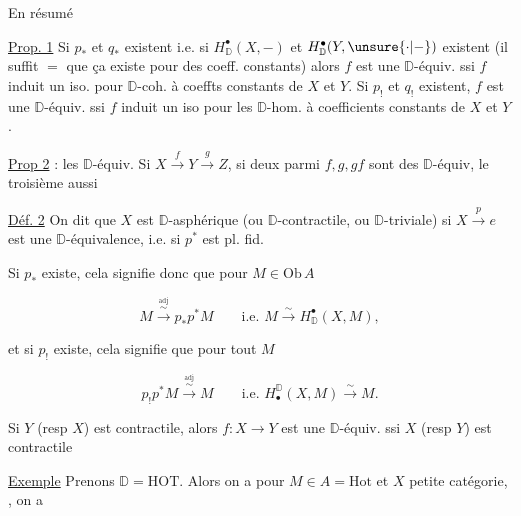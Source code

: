
En résumé


\uline{Prop. 1} Si  $p_*$ et $q_*$ existent i.e. si $H^\bullet_{\mathbb D}(X,-)$ et $H^\bullet_{\mathbb D}(Y,\unsure{\cdot|-})$ existent (il suffit $=$ que ça existe pour des coeff. constants) alors $f$ est une $\mathbb D$-équiv. ssi  $f$ induit un iso. pour  $\mathbb D$-coh. à coeffts constants de $X$ et $Y$. Si $p_!$ et $q_!$ existent,  $f$ est une $\mathbb D$-équiv. ssi $f$ induit un iso pour les $\mathbb D$-hom. à coefficients constants de $X$ et $Y$.

\uline{Prop 2} :  les  $\mathbb D$-équiv. Si $X\xrightarrow{f}Y\xrightarrow{g}Z$, si deux parmi $f,g,gf$ sont des $\mathbb D$-équiv, le troisième aussi

\uline{Déf. 2} On dit que $X$  est $\mathbb D$-asphérique (ou $\mathbb D$-contractile, ou $\mathbb D$-triviale) si $X\xrightarrow p e$ est une $\mathbb D$-équivalence, i.e. si $p^*$ est pl. fid.

 Si $p_*$ existe, cela signifie donc que pour $M\in\mathrm{Ob}\,A$

\[ M\xrightarrow{\overset{\mathrm{adj}}{\sim}}p_*p^*M\qquad\text{i.e. }M\xrightarrow{\sim}H^\bullet_{\mathbb D}(X,M), \]

et si $p_!$ existe, cela signifie que pour tout $M$

\[ p_!p^*M\xrightarrow{\overset{\mathrm{adj}}{\sim}}M\qquad\text{i.e. }H_\bullet^{\mathbb D}(X,M)\xrightarrow{\sim}M. \]

  Si $Y$ \deleted{\unsure{$=$}} (resp $X$) est contractile, alors $f:X\longrightarrow Y$ est une $\mathbb D$-équiv. ssi $X$ (resp $Y$) est contractile


\uline{Exemple} Prenons $\mathbb D=\mathrm{HOT}$.  Alors on a pour $M\in A=\mathrm{Hot}$ et $X$ petite catégorie, , on a

